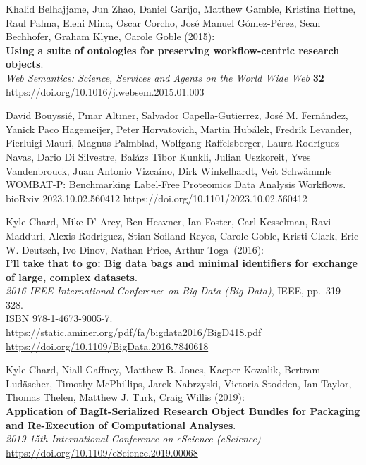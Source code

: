 \documentclass[10pt,letterpaper]{article}
\begin{document}
\begin{thebibliography}{10}
\begin{small}
Khalid Belhajjame, Jun Zhao, Daniel Garijo, Matthew Gamble, Kristina Hettne, Raul Palma, Eleni Mina, Oscar Corcho, José Manuel Gómez-Pérez, Sean Bechhofer, Graham Klyne, Carole Goble
(2015):\\
\textbf{Using a suite of ontologies for preserving workflow-centric research objects}.\\
\emph{Web Semantics: Science, Services and Agents on the World Wide Web} \textbf{32}\\
\url{https://doi.org/10.1016/j.websem.2015.01.003}

 David Bouyssié, Pınar Altıner, Salvador Capella-Gutierrez, José M. Fernández, Yanick Paco Hagemeijer, Peter Horvatovich, Martin Hubálek, Fredrik Levander, Pierluigi Mauri, Magnus Palmblad, Wolfgang Raffelsberger, Laura Rodríguez-Navas, Dario Di Silvestre, Balázs Tibor Kunkli, Julian Uszkoreit, Yves Vandenbrouck, Juan Antonio Vizcaíno, Dirk Winkelhardt, Veit Schwämmle
WOMBAT-P: Benchmarking Label-Free Proteomics Data Analysis Workflows.
bioRxiv 2023.10.02.560412
https://doi.org/10.1101/2023.10.02.560412

Kyle Chard, Mike D' Arcy, Ben Heavner, Ian Foster, Carl
Kesselman, Ravi Madduri, Alexis Rodriguez, Stian Soiland-Reyes, Carole
Goble, Kristi Clark, Eric W. Deutsch, Ivo Dinov, Nathan Price, Arthur
Toga~(2016):\\
\textbf{I'll take that to go: Big data bags and minimal identifiers for
exchange of large, complex datasets}.\\
\emph{2016 IEEE International Conference on Big Data (Big Data)}, IEEE,
pp.~319--328.\\
ISBN 978-1-4673-9005-7.\\
\url{https://static.aminer.org/pdf/fa/bigdata2016/BigD418.pdf}\\
\url{https://doi.org/10.1109/BigData.2016.7840618}

Kyle Chard, Niall Gaffney, Matthew B. Jones, Kacper
Kowalik, Bertram Ludäscher, Timothy McPhillips, Jarek Nabrzyski,
Victoria Stodden, Ian Taylor, Thomas Thelen, Matthew J. Turk, Craig
Willis (2019):\\
\textbf{Application of BagIt-Serialized Research Object Bundles for Packaging and Re-Execution of Computational Analyses}.\\
\emph{2019 15th International Conference on eScience (eScience)}\\
\url{https://doi.org/10.1109/eScience.2019.00068}


\end{small}
\end{thebibliography}
\end{document}
